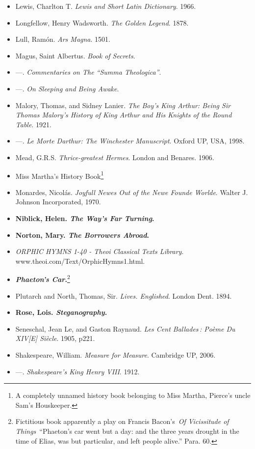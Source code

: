 \documentclass[12pt]{article}
\begin{document}
\begin{itemize}
\item
  Lewis, Charlton T. \emph{Lewis and Short Latin Dictionary}. 1966.
\item
  Longfellow, Henry Wadsworth. \emph{The Golden Legend}. 1878.
\item
  Lull, Ramón. \emph{Ars Magna}. 1501.
\item
  Magus, Saint Albertus. \emph{Book of Secrets}.
\item
  ---. \emph{Commentaries on The ``Summa Theologica''}.
\item
  ---. \emph{On Sleeping and Being Awake}.
\item
  Malory, Thomas, and Sidney Lanier. \emph{The Boy's King Arthur: Being Sir Thomas Malory's History of King Arthur and His Knights of the Round Table}. 1921.
\item
  ---. \emph{Le Morte Darthur: The Winchester Manuscript}. Oxford UP, USA, 1998.
\item
  Mead, G.R.S. \emph{Thrice-greatest Hermes}. London and Benares. 1906.
\item
  Miss Martha's History Book\footnote{A completely unnamed history book belonging to Miss Martha, Pierce's uncle Sam's Houskeeper.}
\item
  Monardes, Nicolás. \emph{Joyfull Newes Out of the Newe Founde Worlde}. Walter J. Johnson Incorporated, 1970.
\item
  \textbf{Niblick, Helen. \emph{The Way's Far Turning}.}
\item
  \textbf{Norton, Mary. \emph{The Borrowers Abroad}.}
\item
  \emph{ORPHIC HYMNS 1-40 - Theoi Classical Texts Library}. www.theoi.com/Text/OrphicHymns1.html.
\item
  \textbf{\emph{Phaeton's Car}.}\footnote{Fictitious book apparently a play on Francis Bacon's~\emph{Of Vicissitude of Things}~``Phaeton's car went but a day: and the three years drought in the time of Elias, was but particular, and left people alive.'' Para. 60.}
\item
  Plutarch and North, Thomas, Sir. \emph{Lives. Englished}. London Dent. 1894.
\item
  \textbf{Rose, Lois. \emph{Steganography}.}
\item
  Seneschal, Jean Le, and Gaston Raynaud. \emph{Les Cent Ballades\,: Poème Du XIV{[}E{]} Siècle}. 1905, p221.
\item
  Shakespeare, William. \emph{Measure for Measure}. Cambridge UP, 2006.
\item
  ---. \emph{Shakespeare's King Henry VIII}. 1912.

\end{itemize}
\end{document}
